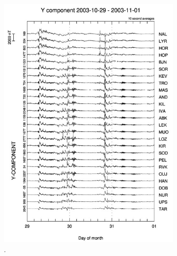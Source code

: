 \begin{figure}[H]
\begin{subfigure}[b]{0.34\textwidth}
                \includegraphics[width=\linewidth]{figures/IMAGE_Y_gram.jpg}
                \caption{\cite{image}.}
				\label{fig:image_y_gram}
        \end{subfigure}%
        \begin{subfigure}[b]{0.33\textwidth}

\end{subfigure}
\end{figure}
